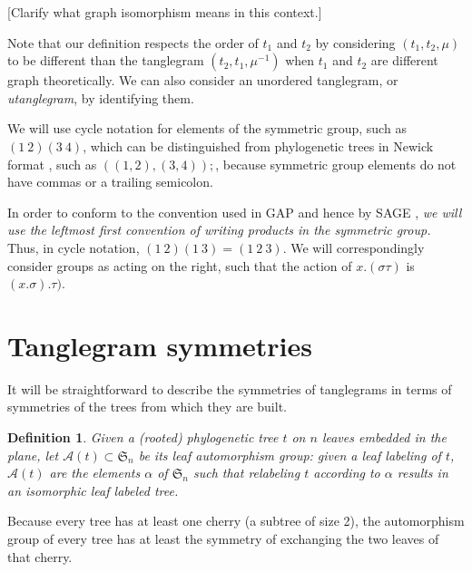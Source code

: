 \documentclass{amsart}
\newtheorem{definition}{Definition}
\newcommand{\fS}{\mathfrak S}
\newcommand{\aut}{\mathcal A}
\newcommand{\pairing}{\mu}
\begin{document}
[Clarify what graph isomorphism means in this context.]

Note that our definition respects the order of $t_1$ and $t_2$ by considering $(t_1, t_2, \pairing)$ to be different than the tanglegram $(t_2, t_1, \pairing^{-1})$ when $t_1$ and $t_2$ are different graph theoretically.
We can also consider an unordered tanglegram, or \emph{utanglegram}, by identifying them.

We will use cycle notation for elements of the symmetric group, such as $(1\ 2) (3\ 4)$, which can be distinguished from phylogenetic trees in Newick format \cite{wiki:newick}, such as $((1,2),(3,4));$, because symmetric group elements do not have commas or a trailing semicolon.

In order to conform to the convention used in GAP \cite{GAP4} and hence by SAGE \cite{SteinJoyner2005}, \emph{we will use the leftmost first convention of writing products in the symmetric group.}
Thus, in cycle notation, $(1\ 2) (1\ 3) = (1\ 2\ 3)$.
We will correspondingly consider groups as acting on the right, such that the action of $x.(\sigma \tau)$ is $(x.\sigma) . \tau)$.


\section{Tanglegram symmetries}
It will be straightforward to describe the symmetries of tanglegrams in terms of symmetries of the trees from which they are built.
\begin{definition}
Given a (rooted) phylogenetic tree $t$ on $n$ leaves embedded in the plane, let $\aut(t) \subset \fS_n$ be its leaf automorphism group: given a leaf labeling of $t$, $\aut(t)$ are the elements $\alpha$ of $\fS_n$ such that relabeling $t$ according to $\alpha$ results in an isomorphic leaf labeled tree.
\end{definition}
Because every tree has at least one cherry (a subtree of size 2), the automorphism group of every tree has at least the symmetry of exchanging the two leaves of that cherry.
\end{document}
